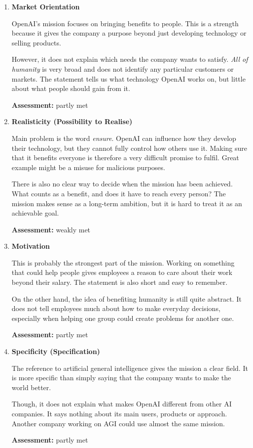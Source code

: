 \documentclass[
  a4paper,
]{article}
\begin{document}
\begin{enumerate}
\def\labelenumi{\arabic{enumi}.}
\item
  \textbf{Market Orientation}

  OpenAI's mission focuses on bringing benefits to people. This is a
  strength because it gives the company a purpose beyond just developing
  technology or selling products.

  However, it does not explain which needs the company wants to satisfy.
  \emph{All of humanity} is very broad and does not identify any
  particular customers or markets. The statement tells us what
  technology OpenAI works on, but little about what people should gain
  from it.

  \textbf{Assessment:} partly met
\item
  \textbf{Realisticity (Possibility to Realise)}

  Main problem is the word \emph{ensure}. OpenAI can influence how they
  develop their technology, but they cannot fully control how others use
  it. Making sure that it benefits everyone is therefore a very
  difficult promise to fulfil. Great example might be a misuse for
  malicious purposes.

  There is also no clear way to decide when the mission has been
  achieved. What counts as a benefit, and does it have to reach every
  person? The mission makes sense as a long-term ambition, but it is
  hard to treat it as an achievable goal.

  \textbf{Assessment:} weakly met
\item
  \textbf{Motivation}

  This is probably the strongest part of the mission. Working on
  something that could help people gives employees a reason to care
  about their work beyond their salary. The statement is also short and
  easy to remember.

  On the other hand, the idea of benefiting humanity is still quite
  abstract. It does not tell employees much about how to make everyday
  decisions, especially when helping one group could create problems for
  another one.

  \textbf{Assessment:} partly met
\item
  \textbf{Specificity (Specification)}

  The reference to artificial general intelligence gives the mission a
  clear field. It is more specific than simply saying that the company
  wants to make the world better.

  Though, it does not explain what makes OpenAI different from other AI
  companies. It says nothing about its main users, products or approach.
  Another company working on AGI could use almost the same mission.

  \textbf{Assessment:} partly met
\end{enumerate}
\end{document}
